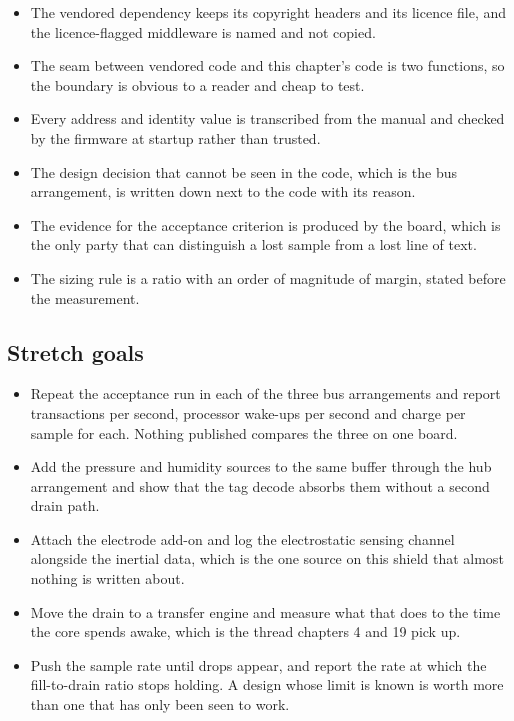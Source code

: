 \begin{itemize}
\item The vendored dependency keeps its copyright headers and its licence file,
and the licence-flagged middleware is named and not copied.
\item The seam between vendored code and this chapter's code is two functions,
so the boundary is obvious to a reader and cheap to test.
\item Every address and identity value is transcribed from the manual and
checked by the firmware at startup rather than trusted.
\item The design decision that cannot be seen in the code, which is the bus
arrangement, is written down next to the code with its reason.
\item The evidence for the acceptance criterion is produced by the board, which
is the only party that can distinguish a lost sample from a lost line of text.
\item The sizing rule is a ratio with an order of magnitude of margin, stated
before the measurement.
\end{itemize}

\subsection*{Stretch goals}

\begin{itemize}
\item Repeat the acceptance run in each of the three bus arrangements and report
transactions per second, processor wake-ups per second and charge per sample for
each. Nothing published compares the three on one board.
\item Add the pressure and humidity sources to the same buffer through the hub
arrangement and show that the tag decode absorbs them without a second drain
path.
\item Attach the electrode add-on and log the electrostatic sensing channel
alongside the inertial data, which is the one source on this shield that almost
nothing is written about.
\item Move the drain to a transfer engine and measure what that does to the time
the core spends awake, which is the thread chapters 4 and 19 pick up.
\item Push the sample rate until drops appear, and report the rate at which the
fill-to-drain ratio stops holding. A design whose limit is known is worth more
than one that has only been seen to work.
\end{itemize}

